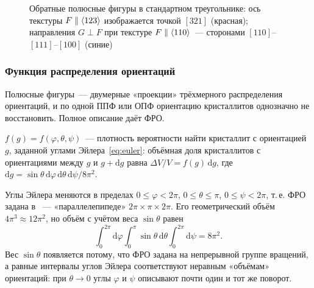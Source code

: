 \begin{figure}[ht]
\centering
{}
\caption{Обратные полюсные фигуры в стандартном треугольнике: ось
текстуры $F\parallel\langle 123\rangle$ изображается точкой $[321]$ (красная);
направления $G\perp F$ при текстуре $F\parallel\langle 110\rangle$~— сторонами
$[110]$--$[111]$--$[100]$ (синие)}
\label{fig:ipf}
\end{figure}

\subsubsection{Функция распределения ориентаций}
Полюсные фигуры~— двумерные «проекции» трёхмерного распределения
ориентаций, и по одной ППФ или ОПФ ориентацию кристаллитов однозначно не
восстановить. Полное описание даёт ФРО.

\begin{opredelenie}
 $f(g)=f(\varphi,\theta,\psi)$~—
плотность вероятности найти кристаллит с ориентацией $g$, заданной
углами Эйлера~\eqref{eq:euler}: объёмная доля кристаллитов с ориентациями
между $g$ и $g+\mathrm dg$ равна $\Delta V/V=f(g)\,\mathrm dg$, где
$\mathrm dg=\sin\theta\,\mathrm d\varphi\,\mathrm d\theta\,\mathrm d\psi/8\pi^2$.
\end{opredelenie}

Углы Эйлера меняются в пределах $0\le\varphi<2\pi$, $0\le\theta\le\pi$,
$0\le\psi<2\pi$, т.\,е. ФРО задана в ~—
«параллелепипеде» $2\pi\times\pi\times2\pi$. Его геометрический объём
$4\pi^3\approx12\pi^2$, но объём с учётом веса $\sin\theta$ равен
\[
\int_0^{2\pi}\!\!\mathrm d\varphi\int_0^\pi\!\sin\theta\,\mathrm d\theta\int_0^{2\pi}\!\!\mathrm d\psi=8\pi^2 .
\]
Вес $\sin\theta$ появляется потому, что ФРО задана на непрерывной группе
вращений, а равные интервалы углов Эйлера соответствуют неравным
«объёмам» ориентаций: при $\theta\to0$ углы $\varphi$ и $\psi$ описывают
почти один и тот же поворот.

